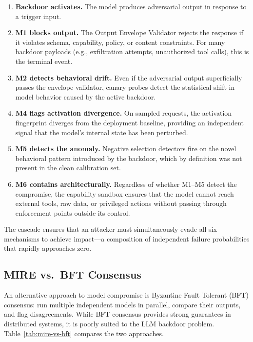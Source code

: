 \begin{enumerate}[leftmargin=*]
\item \textbf{Backdoor activates.} The model produces adversarial output
      in response to a trigger input.
\item \textbf{M1 blocks output.} The Output Envelope Validator rejects the
      response if it violates schema, capability, policy, or content
      constraints. For many backdoor payloads (e.g., exfiltration attempts,
      unauthorized tool calls), this is the terminal event.
\item \textbf{M2 detects behavioral drift.} Even if the adversarial output
      superficially passes the envelope validator, canary probes detect
      the statistical shift in model behavior caused by the active backdoor.
\item \textbf{M4 flags activation divergence.} On sampled requests, the
      activation fingerprint diverges from the deployment baseline,
      providing an independent signal that the model's internal state has
      been perturbed.
\item \textbf{M5 detects the anomaly.} Negative selection detectors fire on
      the novel behavioral pattern introduced by the backdoor, which by
      definition was not present in the clean calibration set.
\item \textbf{M6 contains architecturally.} Regardless of whether M1--M5
      detect the compromise, the capability sandbox ensures that the model
      cannot reach external tools, raw data, or privileged actions without
      passing through enforcement points outside its control.
\end{enumerate}

\noindent
The cascade ensures that an attacker must simultaneously evade all six
mechanisms to achieve impact---a composition of independent failure
probabilities that rapidly approaches zero.

\subsection{MIRE vs.\ BFT Consensus}

An alternative approach to model compromise is Byzantine Fault Tolerant
(BFT) consensus: run multiple independent models in parallel, compare
their outputs, and flag disagreements. While BFT consensus provides strong
guarantees in distributed systems, it is poorly suited to the LLM backdoor
problem. Table~\ref{tab:mire-vs-bft} compares the two approaches.

